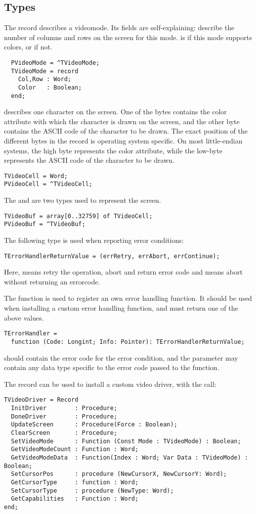 \subsection{Types}
The  record describes a videomode. Its fields are
self-explaining:  describe the number of columns and 
rows on the screen for this mode.  is  if this mode
supports colors, or  if not.
\begin{verbatim}
  PVideoMode = ^TVideoMode;
  TVideoMode = record
    Col,Row : Word;
    Color   : Boolean;
  end;
\end{verbatim}
 describes one character on the screen. One of the bytes 
contains the color attribute with which the character is drawn on the screen,
and the other byte contains the ASCII code of the character to be drawn. The
exact position of the different bytes in the record is operating system specific.
On most little-endian systems, the high byte represents the color attribute,
while the low-byte represents the ASCII code of the character to be drawn.
\begin{verbatim}
TVideoCell = Word;
PVideoCell = ^TVideoCell;
\end{verbatim}
The  and  are two types used to represent the
screen.
\begin{verbatim}
TVideoBuf = array[0..32759] of TVideoCell;
PVideoBuf = ^TVideoBuf;
\end{verbatim}
The following type is used when reporting error conditions:
\begin{verbatim}
TErrorHandlerReturnValue = (errRetry, errAbort, errContinue);
\end{verbatim}
Here,  means retry the operation, 
abort and return error code and  means abort
without returning an errorcode.

The  function is used to register an own error
handling function. It should be used when installing a custom error
handling function, and must return one of the above values.
\begin{verbatim}
TErrorHandler = 
  function (Code: Longint; Info: Pointer): TErrorHandlerReturnValue;
\end{verbatim}
 should contain the error code for the error condition, 
and the  parameter may contain any data type specific to 
the error code passed to the function.

The  record can be used to install a custom video
driver, with the  call:
\begin{verbatim}
TVideoDriver = Record
  InitDriver        : Procedure;
  DoneDriver        : Procedure;
  UpdateScreen      : Procedure(Force : Boolean);
  ClearScreen       : Procedure;
  SetVideoMode      : Function (Const Mode : TVideoMode) : Boolean;
  GetVideoModeCount : Function : Word;
  GetVideoModeData  : Function(Index : Word; Var Data : TVideoMode) : Boolean;
  SetCursorPos      : procedure (NewCursorX, NewCursorY: Word);
  GetCursorType     : function : Word;
  SetCursorType     : procedure (NewType: Word);
  GetCapabilities   : Function : Word;
end;
\end{verbatim}

